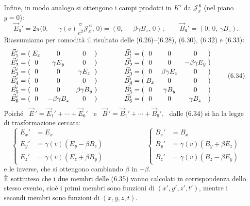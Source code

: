 Infine, in modo analogo si ottengono i campi prodotti in $K'$ da
$\mathcal J_x^{\,6}$ (nel piano $y=0$):
\begin{equation}
  \vec E_6'=2\pi\big(0,\,-\gamma(v)\frac{v}{c^2}\mathcal J_x^{\,6},\,0\big)
  =(0,\,-\beta\gamma B_z,\,0)\,;\qquad\vec B_6'=(0,\,0,\,\gamma B_z).
  \tag{6.33}
\end{equation}
Riassumiamo per comodit\`a il risultato delle (6.26)--(6.28), (6.30), (6.32) e
(6.33):
\begin{equation}
  \begin{array}{r@{\;}c@{\;}c@{\quad}c@{\quad}c@{\;}c@{\qquad\qquad}r@{\;}c@{
  \;}c@{\quad}c@{\quad}c@{\;}c}
    \vec E_1'=&(&E_x&0&0&)&\vec B_1'=&(&0&0&0&)\\
    \vec E_2'=&(&0&\gamma E_y&0&)&\vec B_2'=&(&0&0&-\beta\gamma E_y&)\\
    \vec E_3'=&(&0&0&\gamma E_z&)&\vec B_3'=&(&0&\beta\gamma E_z&0&)\\
    \vec E_4'=&(&0&0&0&)&\vec B_4'=&(&B_x&0&0&)\\
    \vec E_5'=&(&0&0&\beta\gamma B_y&)&\vec B_5'=&(&0&\gamma B_y&0&)\\
    \vec E_6'=&(&0&-\beta\gamma B_z&0&)&\vec B_6'=&(&0&0&\gamma B_z&)
  \end{array}
  \tag{6.34}
\end{equation}
Poich\'e \ $\vec E\,'=\vec E_1'+\cdots+\vec E_6'$ \ e
\ $\vec B\,'=\vec B_1'+\cdots+\vec B_6'$, \ dalle (6.34) si ha la legge di
trasformazione cercata:
\begin{equation}
  \left\{\begin{aligned}
    E_x'&=E_x\\
    E_y'&=\gamma(v)(E_y-\beta B_z)\\
    E_z'&=\gamma(v)(E_z+\beta B_y)
  \end{aligned}\right.
  \qquad\qquad\qquad
  \left\{\begin{aligned}
    B_x'&=B_x\\
    B_y'&=\gamma(v)(B_y+\beta E_z)\\
    B_z'&=\gamma(v)(B_z-\beta E_y)
  \end{aligned}\right.
  \tag{6.35}
\end{equation}
e le inverse, che si ottengono cambiando $\beta$ in $-\beta$.\\
\`E sottinteso che i due membri delle (6.35) vanno calcolati in corrispondenza
dello stesso evento, cio\`e i primi membri sono funzioni di $(x',y',z',t')$,
mentre i secondi membri sono funzioni di $(x,y,z,t)$.

